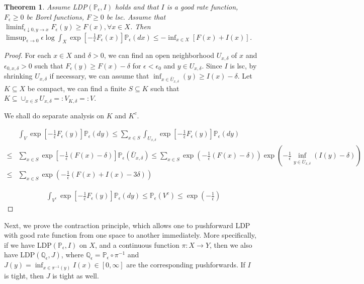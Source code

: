 \documentclass[openany,oneside]{article}
\newtheorem{thm}{Theorem}[section]
\theoremstyle{definition}
\theoremstyle{remark}
\renewcommand{\P}{\mathbb{P}} %
\begin{document}
\begin{thm}
Assume LDP$(\P_\epsilon, I)$ holds and that $I$ is a good rate function, $F_\epsilon \ge 0$ be Borel functions, $F\ge 0$ be lsc. Assume that $\liminf_{\epsilon \downarrow 0, y\to x} F_{\epsilon}(y) \ge F(x), \forall x\in X$. Then $\limsup_{\epsilon \to 0} \epsilon \log \int_X \exp[-\frac{1}{\epsilon} F_\epsilon(x)] \P_\epsilon(d x) \le -\inf_{x\in X}[F(x) + I(x)]$.
\end{thm}
\begin{proof}
For each $x\in X$ and $\delta >0$, we can find an open neighborhood $U_{x,\delta}$ of $x$ and $\epsilon_{0,x,\delta} >0$ such that $F_{\epsilon}(y) \ge F(x) - \delta$ for $\epsilon < \epsilon_0$ and $y\in U_{x,\delta}$. Since $I$ is lsc, by shrinking $U_{x,\delta}$ if necessary, we can assume that $\inf_{x\in \bar{U}_{x,\delta}}(y) \ge I(x) - \delta$. Let $K \subseteq X$ be compact, we can find a finite $S \subseteq K$ such that $K \subseteq \cup_{x\in S} U_{x,\delta} =: V_{K,\delta} =: V$.
\par
We shall do separate analysis on $K$ and $K^c$.
\par
\begin{align*}
& \int_{V} \exp[-\frac{1}{\epsilon} F_\epsilon (y)] \P_\epsilon(d y) \le \sum_{x\in S} \int_{U_{x,\delta}} \exp[-\frac{1}{\epsilon} F_{\epsilon}(y)] \P_\epsilon(d y) \\
\le & \sum_{x\in S} \exp[-\frac{1}{\epsilon}(F(x)-\delta)] \P_\epsilon(\bar{U}_{x,\delta}) \le \sum_{x\in S} \exp(-\frac{1}{\epsilon}(F(x)-\delta)) \exp\left(-\frac{1}{\epsilon} \inf_{y\in \bar{U}_{x,\delta}}(I(y)-\delta) \right) \\
\le & \sum_{x\in S} \exp\left(-\frac{1}{\epsilon}(F(x) + I(x) - 3\delta)\right)
\end{align*}

\begin{align*}
& \int_{V^c} \exp[-\frac{1}{\epsilon} F_{\epsilon}(y)] \P_\epsilon(d y) \le \P_\epsilon(V^c) \le \exp\left(-\frac{1}{\epsilon} \right)
\end{align*}


\end{proof}

Next, we prove the contraction principle, which allows one to pushforward LDP with good rate function from one space to another immediately. More specifically, if we have LDP$(\P_\epsilon, I)$ on $X$, and a continuous function $\pi:X\to Y$, then we also have LDP$(\mathbb{Q}_\epsilon, J)$, where $\mathbb{Q}_\epsilon = \P_\epsilon \circ \pi^{-1}$ and $J(y) = \inf_{x\in \pi^{-1}(y)} I(x) \in [0,\infty]$ are the corresponding pushforwards. If $I$ is tight, then $J$ is tight as well.
\end{document}
